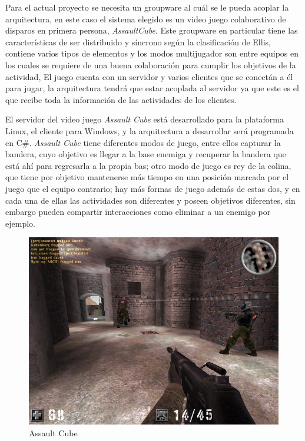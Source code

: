 Para el actual proyecto se necesita un groupware al cu\'al se le pueda acoplar la arquitectura, en este caso el sistema elegido es un video juego colaborativo de disparos en primera persona, \textit{AssaultCube}. Este groupware en particular tiene las caracter\'isticas de ser distribuido y s\'incrono seg\'un la clasificaci\'on de Ellis\cite{ellis1991groupware}, contiene varios tipos de elementos y los modos multijugador son entre equipos en los cuales se requiere de una buena colaboraci\'on para cumplir los objetivos de la actividad, El juego cuenta con un servidor y varios clientes que se conect\'an a \'el para jugar, la arquitectura tendr\'a que estar acoplada al servidor ya que este es el que recibe toda la informaci\'on de las actividades de los clientes.

El servidor del video juego \textit{Assault Cube} est\'a desarrollado para la plataforma Linux, el cliente para Windows, y la arquitectura a desarrollar ser\'a programada en C\#. \textit{Assault Cube} tiene diferentes modos de juego, entre ellos capturar la bandera, cuyo objetivo es llegar a la base enemiga y recuperar la bandera que est\'a ah\'i para regresarla a la propia bas; otro modo de juego es rey de la colina, que tiene por objetivo mantenerse m\'as tiempo en una posici\'on marcada por el juego que el equipo contrario; hay m\'as formas de juego adem\'as de estas dos, y en cada una de ellas las actividades son diferentes y poseen objetivos diferentes, sin embargo pueden compartir interacciones como eliminar a un enemigo por ejemplo.

\begin{figure}[h!]
\centering
\includegraphics[scale=.20]{images/assaultcube}
\caption{Assault Cube}
\label{gw:asscb}
\end{figure}

